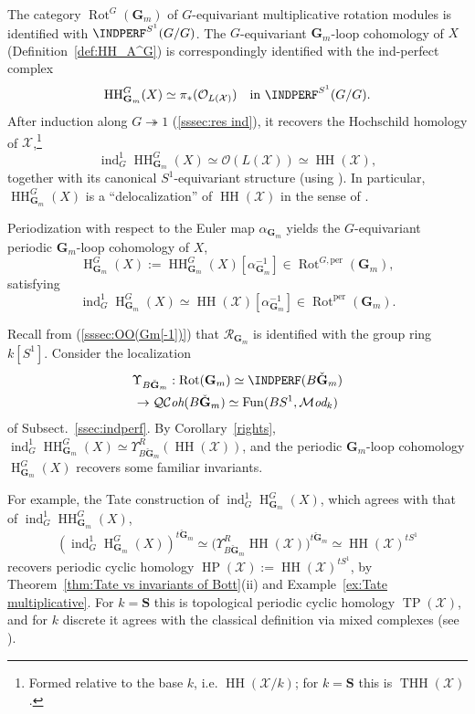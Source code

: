 \documentclass[12pt, oneside]{amsart}
\numberwithin{equation}{section}
\theoremstyle{remark}
\theoremstyle{plain}
\newcommand{\MOD}{\mathcal{M}\textit{od}}
\DeclareMathOperator{\QCOH}{\mathcal{QC}\textit{oh}}
\newcommand{\R}{\mathcal{R}}
\newcommand{\OO}{\mathcal{O}}
\newcommand{\XX}{\mathcal{X}}
\newcommand{\GG}{\mathbf{G}}
\newcommand{\GGm}{\mathbf{G}_{m}}
\newcommand{\Ren}{\Upsilon}
\newcommand{\HH}{\operatorname{HH}}
\newcommand{\Hcoh}{\operatorname{H}}
\newcommand{\Rot}{\operatorname{Rot}}
\begin{document}
The category $\Rot^G(\GGm)$ of $G$-equivariant multiplicative rotation modules is identified with $\INDPERF^{S^1}(G/G)$.
The $G$-equivariant $\GGm$-loop cohomology of $X$ (Definition~\ref{def:HH_A^G}) is correspondingly identified with the ind-perfect complex
\[ \HH_{\GGm}^{G}(X) \simeq \pi_*(\OO_{L(\XX)}) \quad \text{in} \ \INDPERF^{S^1}(G/G). \]
After induction along $G \twoheadrightarrow 1$ (\ref{sssec:res ind}), it recovers the Hochschild homology of $\XX$,\footnote{%
  Formed relative to the base $k$, i.e. $\operatorname{HH}(\XX/k)$; for $k = \mathbf{S}$ this is $\operatorname{THH}(\XX)$.
}
\[ \operatorname{ind}_G^1\HH_{\GGm}^{G}(X) \simeq \OO(L(\XX)) \simeq \operatorname{HH}(\XX), \]
together with its canonical $S^1$-equivariant structure (using \cite[Thm.~1.2(1), Cor.~4.8]{BFN}).
In particular, $\HH_{\GGm}^{G}(X)$ is a ``delocalization'' of $\operatorname{HH}(\XX)$ in the sense of \cite{BaumBrylinskiMacPherson}.

Periodization with respect to the Euler map $\alpha_{\GGm}$ yields the $G$-equivariant periodic $\GGm$-loop cohomology of $X$,
\[ \Hcoh_{\GGm}^{G}(X) := \HH_{\GGm}^{G}(X)[\alpha_{\GGm}^{-1}] \in \Rot^{G,\mathrm{per}}(\GGm), \]
satisfying
\[ \operatorname{ind}_G^1\Hcoh_{\GGm}^{G}(X) \simeq \operatorname{HH}(\XX)[\alpha_{\GGm}^{-1}] \in \Rot^{\mathrm{per}}(\GGm). \]

Recall from (\ref{sssec:OO(Gm[-1])}) that $\R_{\GGm}$ is identified with the group ring $k[S^1]$.
Consider the localization
\begin{multline*}
  \Ren_{B\check{\GG}_m} : \Rot(\GGm) \simeq \INDPERF(B\check{\GG}_m) \\
  \to \QCOH(B\check{\GG}_m) \simeq \operatorname{Fun}(BS^1, \MOD_{k})
\end{multline*}
of Subsect.~\ref{ssec:indperf}.
By Corollary~\ref{rights}, $\operatorname{ind}_G^1\HH_{\GGm}^{G}(X) \simeq \Ren^R_{B\check{\GG}_m}(\operatorname{HH}(\XX))$, and the periodic $\GGm$-loop cohomology $\Hcoh_{\GGm}^{G}(X)$ recovers some familiar invariants.

For example, the Tate construction of $\operatorname{ind}_G^1\Hcoh_{\GGm}^{G}(X)$, which agrees with that of $\operatorname{ind}_G^1\HH_{\GGm}^{G}(X)$,
\[
  (\operatorname{ind}_G^1\Hcoh_{\GGm}^{G}(X))^{t\check{\GG}_m} \simeq \bigl(\Ren^R_{B\check{\GG}_m}\operatorname{HH}(\XX)\bigr)^{t\check{\GG}_m} \simeq \operatorname{HH}(\XX)^{tS^1}
\]
recovers periodic cyclic homology $\operatorname{HP}(\XX) := \operatorname{HH}(\XX)^{tS^1}$, by Theorem~\ref{thm:Tate vs invariants of Bott}(ii) and Example~\ref{ex:Tate multiplicative}.
For $k = \mathbf{S}$ this is topological periodic cyclic homology $\operatorname{TP}(\XX)$, and for $k$ discrete it agrees with the classical definition via mixed complexes (see \cite[Thm.~2.1]{HoyoisCirc}).
\end{document}
